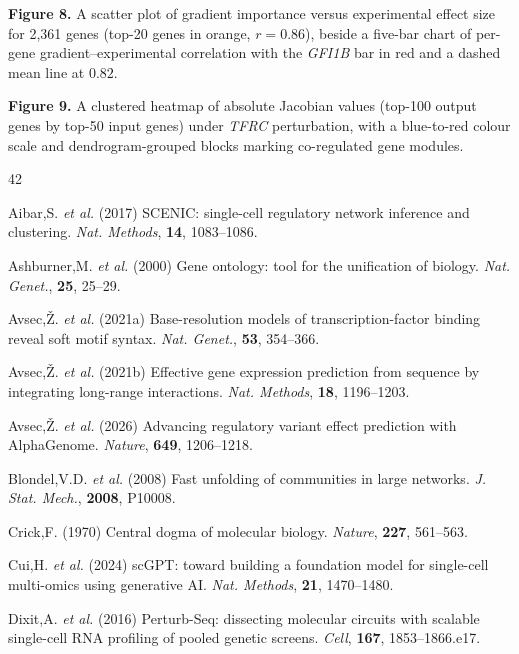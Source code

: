 \documentclass[12pt,a4paper]{article}
\begin{document}
{\textbf{Figure 8.} A scatter plot of gradient importance versus experimental effect size for 2,361 genes (top-20 genes in orange, $r=0.86$), beside a five-bar chart of per-gene gradient--experimental correlation with the \textit{GFI1B} bar in red and a dashed mean line at $0.82$.\par\smallskip
\textbf{Figure 9.} A clustered heatmap of absolute Jacobian values (top-100 output genes by top-50 input genes) under \textit{TFRC} perturbation, with a blue-to-red colour scale and dendrogram-grouped blocks marking co-regulated gene modules.
}

\begin{thebibliography}{42}

Aibar,S. \textit{et al.} (2017) SCENIC: single-cell regulatory network inference and clustering. \textit{Nat. Methods}, \textbf{14}, 1083--1086.

Ashburner,M. \textit{et al.} (2000) Gene ontology: tool for the unification of biology. \textit{Nat. Genet.}, \textbf{25}, 25--29.

Avsec,\v{Z}. \textit{et al.} (2021a) Base-resolution models of transcription-factor binding reveal soft motif syntax. \textit{Nat. Genet.}, \textbf{53}, 354--366.

Avsec,\v{Z}. \textit{et al.} (2021b) Effective gene expression prediction from sequence by integrating long-range interactions. \textit{Nat. Methods}, \textbf{18}, 1196--1203.

Avsec,\v{Z}. \textit{et al.} (2026) Advancing regulatory variant effect prediction with AlphaGenome. \textit{Nature}, \textbf{649}, 1206--1218.

Blondel,V.D. \textit{et al.} (2008) Fast unfolding of communities in large networks. \textit{J. Stat. Mech.}, \textbf{2008}, P10008.

Crick,F. (1970) Central dogma of molecular biology. \textit{Nature}, \textbf{227}, 561--563.

Cui,H. \textit{et al.} (2024) scGPT: toward building a foundation model for single-cell multi-omics using generative AI. \textit{Nat. Methods}, \textbf{21}, 1470--1480.

Dixit,A. \textit{et al.} (2016) Perturb-Seq: dissecting molecular circuits with scalable single-cell RNA profiling of pooled genetic screens. \textit{Cell}, \textbf{167}, 1853--1866.e17.


\end{thebibliography}
\end{document}
